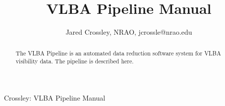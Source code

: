 \documentclass[10pt,onecolumn,final]{IEEEtran}
\begin{document}
%
\title{VLBA Pipeline Manual}
%
%
%

\author{Jared Crossley, NRAO, jcrossle@nrao.edu}

%
{Crossley: VLBA Pipeline Manual}
% 











\maketitle


\begin{abstract}
The VLBA Pipeline is an automated data reduction software system for VLBA visibility data.  The pipeline is described here.
\end{abstract}
\end{document}
